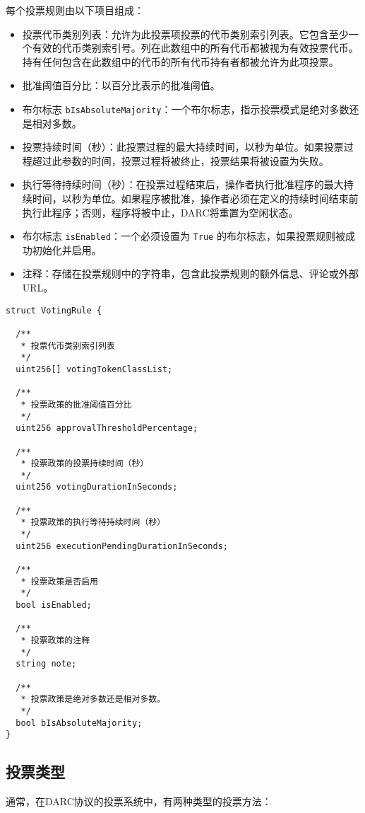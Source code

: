 \documentclass[main.tex]{subfiles}
\begin{document}
每个投票规则由以下项目组成：
\begin{itemize}
    \item 投票代币类别列表：允许为此投票项投票的代币类别索引列表。它包含至少一个有效的代币类别索引号。列在此数组中的所有代币都被视为有效投票代币。持有任何包含在此数组中的代币的所有代币持有者都被允许为此项投票。
    \item 批准阈值百分比：以百分比表示的批准阈值。
    \item 布尔标志 \texttt{bIsAbsoluteMajority}：一个布尔标志，指示投票模式是绝对多数还是相对多数。
    \item 投票持续时间（秒）：此投票过程的最大持续时间，以秒为单位。如果投票过程超过此参数的时间，投票过程将被终止，投票结果将被设置为失败。
    \item 执行等待持续时间（秒）：在投票过程结束后，操作者执行批准程序的最大持续时间，以秒为单位。如果程序被批准，操作者必须在定义的持续时间结束前执行此程序；否则，程序将被中止，DARC将重置为空闲状态。
    \item 布尔标志 \texttt{isEnabled}：一个必须设置为 \texttt{True} 的布尔标志，如果投票规则被成功初始化并启用。
    \item 注释：存储在投票规则中的字符串，包含此投票规则的额外信息、评论或外部URL。
\end{itemize}

\begin{verbatim}
struct VotingRule {

  /**
   * 投票代币类别索引列表
   */
  uint256[] votingTokenClassList;

  /**
   * 投票政策的批准阈值百分比
   */
  uint256 approvalThresholdPercentage;

  /**
   * 投票政策的投票持续时间（秒）
   */
  uint256 votingDurationInSeconds;

  /**
   * 投票政策的执行等待持续时间（秒）
   */
  uint256 executionPendingDurationInSeconds;

  /**
   * 投票政策是否启用
   */
  bool isEnabled;

  /**
   * 投票政策的注释
   */
  string note;

  /**
   * 投票政策是绝对多数还是相对多数。
   */
  bool bIsAbsoluteMajority;
}
\end{verbatim}


\subsection{投票类型}

通常，在DARC协议的投票系统中，有两种类型的投票方法：
\end{document}
